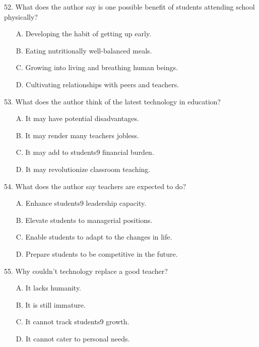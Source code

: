 \documentclass[UTF8,11pt]{ctexart}
\begin{document}
52. What does the author say is one possible benefit of students attending school physically?


\begin{itemize}[leftmargin=2em,itemsep=.2em,topsep=.4em]\item[A.] Developing the habit of getting up early.
\item[B.] Eating nutritionally well-balanced meals.
\item[C.] Growing into living and breathing human beings.
\item[D.] Cultivating relationships with peers and teachers.
\end{itemize}

53. What does the author think of the latest technology in education?


\begin{itemize}[leftmargin=2em,itemsep=.2em,topsep=.4em]\item[A.] It may have potential disadvantages.
\item[B.] It may render many teachers jobless.
\item[C.] It may add to students9 financial burden.
\item[D.] It may revolutionize classroom teaching.
\end{itemize}

54. What does the author say teachers are expected to do?


\begin{itemize}[leftmargin=2em,itemsep=.2em,topsep=.4em]\item[A.] Enhance students9 leadership capacity.
\item[B.] Elevate students to managerial positions.
\item[C.] Enable students to adapt to the changes in life.
\item[D.] Prepare students to be competitive in the future.
\end{itemize}

55. Why couldn't technology replace a good teacher?


\begin{itemize}[leftmargin=2em,itemsep=.2em,topsep=.4em]\item[A.] It lacks humanity.
\item[B.] It is still immature.
\item[C.] It cannot track students9 growth.
\item[D.] It cannot cater to personal needs.
\end{itemize}
\end{document}

